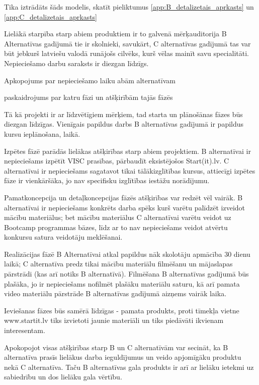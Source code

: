 \par
Tika iztrādāts šāds modelis, skatīt pieliktumus \ref{app:B_detalizetais_aprkasts} un \ref{app:C_detalizetais_aprkasts}
\par
Lielākā starpība starp abiem produktiem ir to galvenā mērķauditorija B Alternatīvas gadījumā tie ir skolnieki, savukārt,
C alternatīvas gadījumā tas var būt jebkurš latviešu valodā runājošs cilvēks, kurš vēlas mainīt savu specialitāti.
Nepieciešamo darbu saraksts ir diezgan līdzīgs.
\par
Apkopojums par nepieciešamo laiku abām alternatīvam
\par
paskaidrojums par katru fāzi un atšķirībām tajās fāzēs
\par
Tā kā projekti ir ar līdzvētīgiem mērķiem, tad starta un plānošānas fāzes būs diezgan līdzīgas. Vienīgais papildus darbs
B alternatīvas gadījumā ir papildus kursu ieplānošana, laikā.
\par
Izpētes fāzē parādās lielākas atšķirības starp abiem projektiem. B alternatīvai ir nepieciešams izpētīt VISC prasības,
pārbaudīt eksistējošos Start(it).lv. C alternatīvai ir nepieciešams sagatavot tikai tālākizglītības kursus, attiecīgi
izpētes fāze ir vienkāršāka, jo nav specifisku izglītības iestāžu norādījumu.
\par
Pamatkoncepcija un detaļkoncepcijas fāzēs atšķirības var redzēt vēl vairāk. B alternatīvai ir 
nepieciešams konkrēts darba spēks kurš varētu palīdzēt izveidot mācību materiālus; bet mācību materiālus C alternatīvai
varētu veidot uz Bootcamp programmas bāzes, līdz ar to nav nepieciešams veidot atvērtu konkursu satura veidotāju meklēšanai.
\par
Realizācijas fāzē B Alternatīvai atkal papildus nāk skolotāju apmācība 30 dienu laikā; C alternatīva predz tikai mācību materiālu
filmēšanu un mājaslapas pārstrādi (kas arī notiks B alternatīvā). Filmēšana B alternatīvas gadījumā būs plašāka, jo ir nepieciešams
nofilmēt plašāku materiālu saturu, kā arī pamata video materiālu pārstrāde B alternatīvas gadījumā aizņems vairāk laika.
\par
Ieviešanas fāzes būs samērā līdzīgas - pamata produkts, proti tīmekļa vietne www.startit.lv tiks izvietoti jaunie materiāli un
tiks piedāvāti ikvienam interesentam.
\par
Apokopojot visas atšķirības starp B un C alternatīvām var secināt, ka B alternatīva prasīs lielākus darba ieguldījumus un veido
apjomīgāku produktu nekā C alternatīva. Taču B alternatīvas gala produkts ir arī ar lielāku ietekmi uz sabiedrību un dos lielāku
gala vērtību.
